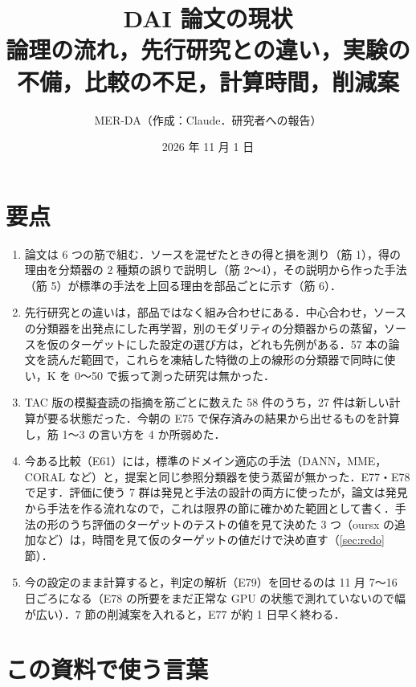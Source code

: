 \documentclass[a4paper,11pt]{ltjsarticle}
\title{DAI 論文の現状\\[2pt]\large 論理の流れ，先行研究との違い，実験の不備，比較の不足，計算時間，削減案}
\author{MER-DA（作成：Claude．研究者への報告）}
\date{2026 年 11 月 1 日}
\begin{document}
\maketitle

\section*{要点}

\begin{enumerate}
\item 論文は 6 つの筋で組む．ソースを混ぜたときの得と損を測り（筋 1），得の理由を分類器の 2 種類の誤りで説明し（筋 2〜4），その説明から作った手法（筋 5）が標準の手法を上回る理由を部品ごとに示す（筋 6）．
\item 先行研究との違いは，部品ではなく組み合わせにある．中心合わせ，ソースの分類器を出発点にした再学習，別のモダリティの分類器からの蒸留，ソースを仮のターゲットにした設定の選び方は，どれも先例がある．57 本の論文を読んだ範囲で，これらを凍結した特徴の上の線形の分類器で同時に使い，K を 0〜50 で振って測った研究は無かった．
\item TAC 版の模擬査読の指摘を筋ごとに数えた 58 件のうち，27 件は新しい計算が要る状態だった．今朝の E75 で保存済みの結果から出せるものを計算し，筋 1〜3 の言い方を 4 か所弱めた．
\item 今ある比較（E61）には，標準のドメイン適応の手法（DANN，MME，CORAL など）と，提案と同じ参照分類器を使う蒸留が無かった．E77・E78 で足す．評価に使う 7 群は発見と手法の設計の両方に使ったが，論文は発見から手法を作る流れなので，これは限界の節に確かめた範囲として書く．手法の形のうち評価のターゲットのテストの値を見て決めた 3 つ（oursx の追加など）は，時間を見て仮のターゲットの値だけで決め直す（\ref{sec:redo} 節）．
\item 今の設定のまま計算すると，判定の解析（E79）を回せるのは 11 月 7〜16 日ごろになる（E78 の所要をまだ正常な GPU の状態で測れていないので幅が広い）．7 節の削減案を入れると，E77 が約 1 日早く終わる．
\end{enumerate}

\section{この資料で使う言葉}
\end{document}
